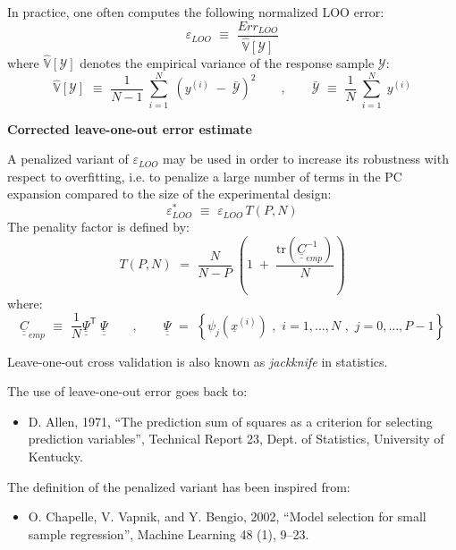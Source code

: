 {In practice, one often computes the following normalized LOO error:
\begin{equation} \label{eq:4.3:8bis}
	\varepsilon_{LOO} \, \, \equiv \, \, \frac{Err_{LOO}}{\hat{\mathbb{V}}[\mathcal{Y}]}
\end{equation}   
where $\hat{\mathbb{V}}[\mathcal{Y}]$ denotes the empirical variance of the response sample $\mathcal{Y}$:
\begin{equation} \label{eq:4.3:4bis}
	 \hat{\mathbb{V}}[\mathcal{Y}] \, \, \equiv \, \, \frac{1}{N-1} \; \sum_{i=1}^{N} \; \left( y^{(i)} \; - \;   \bar{\mathcal{Y}}  \right)^{2} \quad  \quad , \quad \quad   \bar{\mathcal{Y}} \, \, \equiv \, \, \frac{1}{N} \; \sum_{i=1}^{N} \; y^{(i)}
\end{equation}  

\textbf{Corrected leave-one-out error estimate} \vspace{2mm}

A penalized variant of $\varepsilon_{LOO}$ may be used in order to increase its robustness with respect to overfitting, i.e. to penalize a large number of terms in the PC expansion compared to the size of the experimental design:
\begin{equation} 
	\varepsilon_{LOO}^{*} \, \, \equiv \, \, \varepsilon_{LOO} \, T(P,N)
\end{equation} 
The penality factor is defined by:
\begin{equation} 
	T(P,N) \, \, = \, \,   \frac{N}{N-P}  \; \left(1 \; + \; \frac{\mbox{tr} \left( \underline{\underline{C}}_{emp}^{-1}  \right) }{N} \right)
\end{equation} 
where:
\begin{equation} \label{eq:4.3:10bis}
\underline{\underline{C}}_{emp} \, \, \equiv \, \, \frac{1}{N}\underline{\underline{\Psi}}^{\textsf{T}}\; \underline{\underline{\Psi}} \quad \quad , \quad \quad 
\underline{\underline{\Psi}} \, \, = \, \, \left\{ \psi_{j}(\underline{x}^{(i)}) \, \, , \, \, i=1,\dots,N \, \, , \, \, j=0,\dots,P-1 \right\}
\end{equation}
%
}
{Leave-one-out cross validation is also known as \emph{jackknife} in statistics.}

{
The use of leave-one-out error goes back to:
\begin{itemize}
\item D. Allen, 1971, ``The prediction sum of squares as a criterion for selecting prediction variables'', Technical Report 23, Dept. of Statistics, University of Kentucky.
\end{itemize}
The definition of the penalized variant has been inspired from:
\begin{itemize}
\item O. Chapelle, V. Vapnik, and Y. Bengio, 2002, ``Model selection for small sample regression'', Machine Learning 48 (1), 9--23.
\end{itemize}
}
